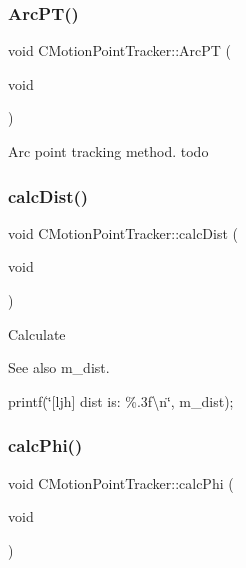 \subsubsection{\texorpdfstring{Arc\+P\+T()}{ArcPT()}}
{\footnotesize\ttfamily void C\+Motion\+Point\+Tracker\+::\+Arc\+PT (\begin{DoxyParamCaption}\item[{void}]{ }\end{DoxyParamCaption})}

Arc point tracking method. todo \mbox{\label{classmotion_1_1CMotionPointTracker_abeaaec052308d9f7cab9d1fbb8db90c3}} 
\subsubsection{\texorpdfstring{calc\+Dist()}{calcDist()}}
{\footnotesize\ttfamily void C\+Motion\+Point\+Tracker\+::calc\+Dist (\begin{DoxyParamCaption}\item[{void}]{ }\end{DoxyParamCaption})}

Calculate \begin{DoxySeeAlso}{See also}
m\+\_\+dist. 
\end{DoxySeeAlso}
printf(\char`\"{}\mbox{[}ljh\mbox{]} dist is\+: \%.\+3f\textbackslash{}n\char`\"{}, m\+\_\+dist); \mbox{\label{classmotion_1_1CMotionPointTracker_ab8567bd6ad6c796d47e72cb633ee93d3}} 
\subsubsection{\texorpdfstring{calc\+Phi()}{calcPhi()}}
{\footnotesize\ttfamily void C\+Motion\+Point\+Tracker\+::calc\+Phi (\begin{DoxyParamCaption}\item[{void}]{ }\end{DoxyParamCaption})}

